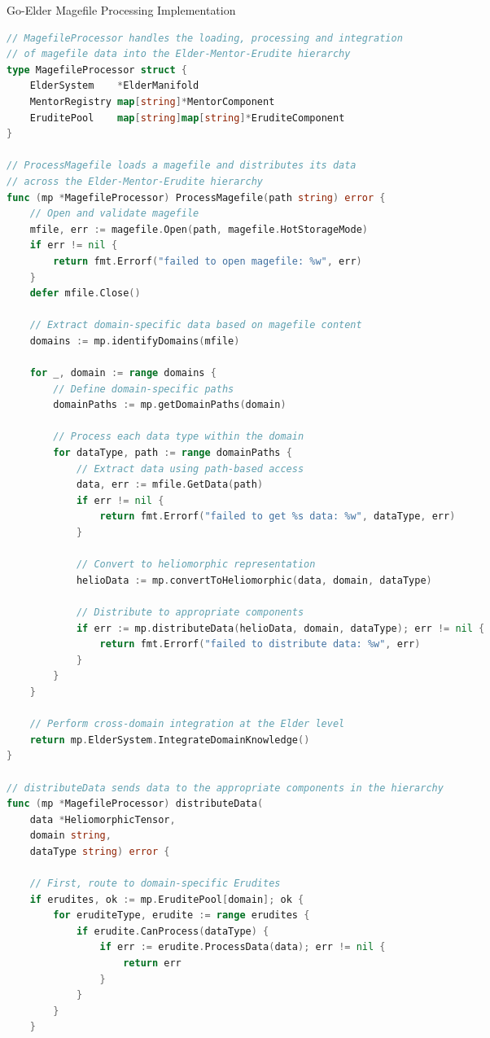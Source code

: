 \begin{algorithm}
\caption{Go-Elder Magefile Processing Implementation}
\label{alg:goeldermagefile}
\begin{lstlisting}[language=Go]
// MagefileProcessor handles the loading, processing and integration 
// of magefile data into the Elder-Mentor-Erudite hierarchy
type MagefileProcessor struct {
    ElderSystem    *ElderManifold
    MentorRegistry map[string]*MentorComponent
    EruditePool    map[string]map[string]*EruditeComponent
}

// ProcessMagefile loads a magefile and distributes its data 
// across the Elder-Mentor-Erudite hierarchy
func (mp *MagefileProcessor) ProcessMagefile(path string) error {
    // Open and validate magefile
    mfile, err := magefile.Open(path, magefile.HotStorageMode)
    if err != nil {
        return fmt.Errorf("failed to open magefile: %w", err)
    }
    defer mfile.Close()
    
    // Extract domain-specific data based on magefile content
    domains := mp.identifyDomains(mfile)
    
    for _, domain := range domains {
        // Define domain-specific paths
        domainPaths := mp.getDomainPaths(domain)
        
        // Process each data type within the domain
        for dataType, path := range domainPaths {
            // Extract data using path-based access
            data, err := mfile.GetData(path)
            if err != nil {
                return fmt.Errorf("failed to get %s data: %w", dataType, err)
            }
            
            // Convert to heliomorphic representation
            helioData := mp.convertToHeliomorphic(data, domain, dataType)
            
            // Distribute to appropriate components
            if err := mp.distributeData(helioData, domain, dataType); err != nil {
                return fmt.Errorf("failed to distribute data: %w", err)
            }
        }
    }
    
    // Perform cross-domain integration at the Elder level
    return mp.ElderSystem.IntegrateDomainKnowledge()
}

// distributeData sends data to the appropriate components in the hierarchy
func (mp *MagefileProcessor) distributeData(
    data *HeliomorphicTensor, 
    domain string, 
    dataType string) error {
    
    // First, route to domain-specific Erudites
    if erudites, ok := mp.EruditePool[domain]; ok {
        for eruditeType, erudite := range erudites {
            if erudite.CanProcess(dataType) {
                if err := erudite.ProcessData(data); err != nil {
                    return err
                }
            }
        }
    }
    

\end{lstlisting}
\end{algorithm}
